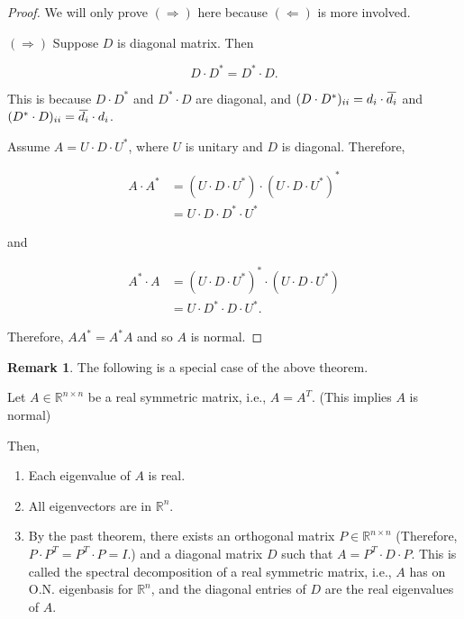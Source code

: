 \documentclass[12pt]{article}
\newcommand{\overbar}[1]{\mkern 1.5mu\overline{\mkern-1.5mu#1\mkern-1.5mu}\mkern 1.5mu}
\theoremstyle{definition}
\newtheorem*{remark}{Remark}
\begin{document}
\begin{proof}
We will only prove $(\Rightarrow)$ here because $(\Leftarrow)$ is more involved.

$(\Rightarrow)$ Suppose $D$ is diagonal matrix. Then 

\[ D \cdot D^* = D^* \cdot D. \]

This is because $D \cdot D^*$ and $D^* \cdot D$ are diagonal, and 
$(D \cdot D^*)_{ii} = d_{i} \cdot \overbar{d_i}$ and 
$(D^* \cdot D)_{ii} = \overbar{d_i} \cdot d_i$.

Assume $A = U \cdot D \cdot U^*$, where $U$ is unitary and $D$ is diagonal. Therefore,

\begin{align*}
A \cdot A^* &= (U \cdot D \cdot U^*) \cdot (U \cdot D \cdot U^*)^* \\
&= U \cdot D \cdot D^* \cdot U^*
\end{align*}

and

\begin{align*}
A^* \cdot A &= (U \cdot D \cdot U^*)^* \cdot (U \cdot D \cdot U^*) \\
&= U \cdot D^* \cdot D \cdot U^*.
\end{align*}

Therefore, $AA^* = A^*A$ and so $A$ is normal.
\end{proof}

\begin{remark}

The following is a special case of the above theorem.

Let $A \in \mathbb{R}^{n \times n}$ be a real symmetric matrix, i.e., $A = A^T$. (This
implies $A$ is normal)

Then,
\begin{enumerate}[label = (\arabic*)]
\item Each eigenvalue of $A$ is real.
\item All eigenvectors are in $\mathbb{R}^n$.
\item By the past theorem, there exists an orthogonal matrix $P \in \mathbb{R}^{n \times n}$
(Therefore, $P \cdot P^T = P^T \cdot P = I$.) and a diagonal matrix $D$ such that
$A = P^T \cdot D \cdot P$. This is called the spectral decomposition of a real symmetric
matrix, i.e., $A$ has on O.N. eigenbasis for $\mathbb{R}^n$, and the diagonal entries
of $D$ are the real eigenvalues of $A$.
\end{enumerate}
\end{remark}
\end{document}
